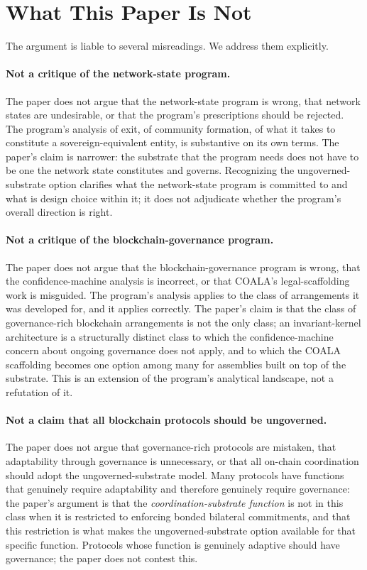 \documentclass[11pt,a4paper]{article}
\theoremstyle{remark}
\begin{document}
\section{What This Paper Is Not}
\label{sec:not}

The argument is liable to several misreadings. We address them
explicitly.

\paragraph{Not a critique of the network-state program.}
The paper does not argue that the network-state program is
wrong, that network states are undesirable, or that the
program's prescriptions should be rejected. The program's
analysis of exit, of community formation, of what it takes to
constitute a sovereign-equivalent entity, is substantive on its
own terms. The paper's claim is narrower: the substrate that
the program needs does not have to be one the network state
constitutes and governs. Recognizing the ungoverned-substrate
option clarifies what the network-state program is committed to
and what is design choice within it; it does not adjudicate
whether the program's overall direction is right.

\paragraph{Not a critique of the blockchain-governance program.}
The paper does not argue that the blockchain-governance program
is wrong, that the confidence-machine analysis is incorrect, or
that COALA's legal-scaffolding work is misguided. The program's
analysis applies to the class of arrangements it was developed
for, and it applies correctly. The paper's claim is that the
class of governance-rich blockchain arrangements is not the only
class; an invariant-kernel architecture is a structurally
distinct class to which the confidence-machine concern about
ongoing governance does not apply, and to which the COALA
scaffolding becomes one option among many for assemblies built
on top of the substrate. This is an extension of the program's
analytical landscape, not a refutation of it.

\paragraph{Not a claim that all blockchain protocols should be ungoverned.}
The paper does not argue that governance-rich protocols are
mistaken, that adaptability through governance is unnecessary,
or that all on-chain coordination should adopt the
ungoverned-substrate model. Many protocols have functions that
genuinely require adaptability and therefore genuinely require
governance: the paper's argument is that the
\emph{coordination-substrate function} is not in this class
when it is restricted to enforcing bonded bilateral commitments,
and that this restriction is what makes the
ungoverned-substrate option available for that specific
function. Protocols whose function is genuinely adaptive should
have governance; the paper does not contest this.
\end{document}
